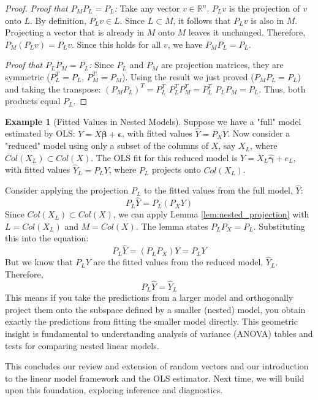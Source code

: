 \documentclass[11pt]{article}
\theoremstyle{definition}
\newtheorem{example}[theorem]{Example}
\newcommand{\R}{\mathbb{R}} %
\newcommand{\T}{^T} %
\newcommand{\bbeta}{\bm{\beta}} %
\newcommand{\bepsilon}{\bm{\epsilon}} %
\newcommand{\bhat}[1]{\hat{\bm{#1}}} %
\begin{document}
\begin{proof}
\textit{Proof that $P_M P_L = P_L$:}
Take any vector $v \in \R^n$. $P_L v$ is the projection of $v$ onto $L$. By definition, $P_L v \in L$. Since $L \subset M$, it follows that $P_L v$ is also in $M$. Projecting a vector that is already in $M$ onto $M$ leaves it unchanged. Therefore, $P_M (P_L v) = P_L v$. Since this holds for all $v$, we have $P_M P_L = P_L$.

\textit{Proof that $P_L P_M = P_L$:}
Since $P_L$ and $P_M$ are projection matrices, they are symmetric ($P_L\T = P_L$, $P_M\T = P_M$).
Using the result we just proved ($P_M P_L = P_L$) and taking the transpose:
$(P_M P_L)\T = P_L\T$
$P_L\T P_M\T = P_L\T$
$P_L P_M = P_L$.
Thus, both products equal $P_L$.
\end{proof}

\begin{example}[Fitted Values in Nested Models]
\label{ex:nested_fitted}
Suppose we have a "full" model estimated by OLS: $Y = X\bbeta + \bepsilon$, with fitted values $\hat{Y} = P_X Y$.
Now consider a "reduced" model using only a subset of the columns of $X$, say $X_L$, where $Col(X_L) \subset Col(X)$. The OLS fit for this reduced model is $Y = X_L \bhat{\gamma} + e_L$, with fitted values $\hat{Y}_L = P_L Y$, where $P_L$ projects onto $Col(X_L)$.

Consider applying the projection $P_L$ to the fitted values from the full model, $\hat{Y}$:
\[ P_L \hat{Y} = P_L (P_X Y) \]
Since $Col(X_L) \subset Col(X)$, we can apply Lemma \ref{lem:nested_projection} with $L = Col(X_L)$ and $M = Col(X)$. The lemma states $P_L P_X = P_L$.
Substituting this into the equation:
\[ P_L \hat{Y} = (P_L P_X) Y = P_L Y \]
But we know that $P_L Y$ are the fitted values from the reduced model, $\hat{Y}_L$.
Therefore,
\[ P_L \hat{Y} = \hat{Y}_L \]
This means if you take the predictions from a larger model and orthogonally project them onto the subspace defined by a smaller (nested) model, you obtain exactly the predictions from fitting the smaller model directly. This geometric insight is fundamental to understanding analysis of variance (ANOVA) tables and tests for comparing nested linear models.
\end{example}

This concludes our review and extension of random vectors and our introduction to the linear model framework and the OLS estimator. Next time, we will build upon this foundation, exploring inference and diagnostics.
\end{document}
